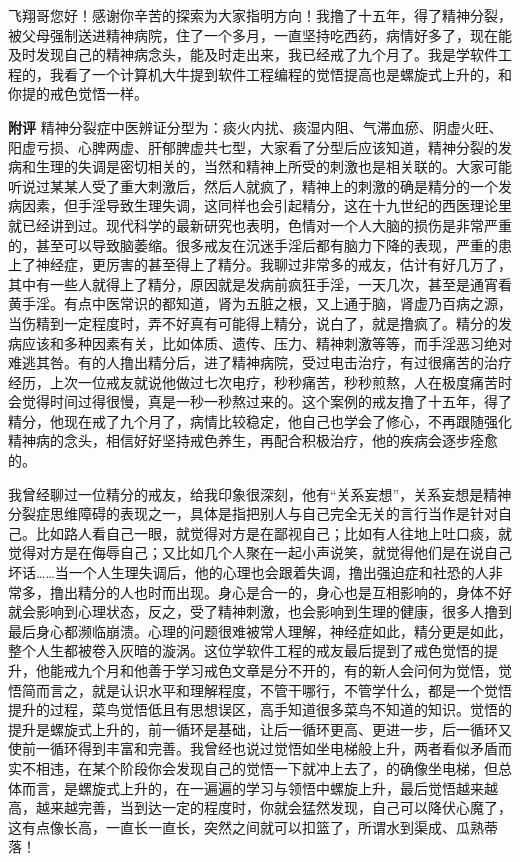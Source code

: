\begin{case}\label{103case9}
    飞翔哥您好！感谢你辛苦的探索为大家指明方向！我撸了十五年，得了精神分裂，被父母强制送进精神病院，住了一个多月，一直坚持吃西药，病情好多了，现在能及时发现自己的精神病念头，能及时走出来，我已经戒了九个月了。我是学软件工程的，我看了一个计算机大牛提到软件工程编程的觉悟提高也是螺旋式上升的，和你提的戒色觉悟一样。

    \textbf{附评} 精神分裂症中医辨证分型为：痰火内扰、痰湿内阻、气滞血瘀、阴虚火旺、阳虚亏损、心脾两虚、肝郁脾虚共七型，大家看了分型后应该知道，精神分裂的发病和生理的失调是密切相关的，当然和精神上所受的刺激也是相关联的。大家可能听说过某某人受了重大刺激后，然后人就疯了，精神上的刺激的确是精分的一个发病因素，但手淫导致生理失调，这同样也会引起精分，这在十九世纪的西医理论里就已经讲到过。现代科学的最新研究也表明，色情对一个人大脑的损伤是非常严重的，甚至可以导致脑萎缩。很多戒友在沉迷手淫后都有脑力下降的表现，严重的患上了神经症，更厉害的甚至得上了精分。我聊过非常多的戒友，估计有好几万了，其中有一些人就得上了精分，原因就是发病前疯狂手淫，一天几次，甚至是通宵看黄手淫。有点中医常识的都知道，肾为五脏之根，又上通于脑，肾虚乃百病之源，当伤精到一定程度时，弄不好真有可能得上精分，说白了，就是撸疯了。精分的发病应该和多种因素有关，比如体质、遗传、压力、精神刺激等等，而手淫恶习绝对难逃其咎。有的人撸出精分后，进了精神病院，受过电击治疗，有过很痛苦的治疗经历，上次一位戒友就说他做过七次电疗，秒秒痛苦，秒秒煎熬，人在极度痛苦时会觉得时间过得很慢，真是一秒一秒熬过来的。这个案例的戒友撸了十五年，得了精分，他现在戒了九个月了，病情比较稳定，他自己也学会了修心，不再跟随强化精神病的念头，相信好好坚持戒色养生，再配合积极治疗，他的疾病会逐步痊愈的。

    我曾经聊过一位精分的戒友，给我印象很深刻，他有“关系妄想”，关系妄想是精神分裂症思维障碍的表现之一，具体是指把别人与自己完全无关的言行当作是针对自己。比如路人看自己一眼，就觉得对方是在鄙视自己；比如有人往地上吐口痰，就觉得对方是在侮辱自己；又比如几个人聚在一起小声说笑，就觉得他们是在说自己坏话……当一个人生理失调后，他的心理也会跟着失调，撸出强迫症和社恐的人非常多，撸出精分的人也时而出现。身心是合一的，身心也是互相影响的，身体不好就会影响到心理状态，反之，受了精神刺激，也会影响到生理的健康，很多人撸到最后身心都濒临崩溃。心理的问题很难被常人理解，神经症如此，精分更是如此，整个人生都被卷入灰暗的漩涡。这位学软件工程的戒友最后提到了戒色觉悟的提升，他能戒九个月和他善于学习戒色文章是分不开的，有的新人会问何为觉悟，觉悟简而言之，就是认识水平和理解程度，不管干哪行，不管学什么，都是一个觉悟提升的过程，菜鸟觉悟低且有思想误区，高手知道很多菜鸟不知道的知识。觉悟的提升是螺旋式上升的，前一循环是基础，让后一循环更高、更进一步，后一循环又使前一循环得到丰富和完善。我曾经也说过觉悟如坐电梯般上升，两者看似矛盾而实不相违，在某个阶段你会发现自己的觉悟一下就冲上去了，的确像坐电梯，但总体而言，是螺旋式上升的，在一遍遍的学习与领悟中螺旋上升，最后觉悟越来越高，越来越完善，当到达一定的程度时，你就会猛然发现，自己可以降伏心魔了，这有点像长高，一直长一直长，突然之间就可以扣篮了，所谓水到渠成、瓜熟蒂落！
\end{case}

